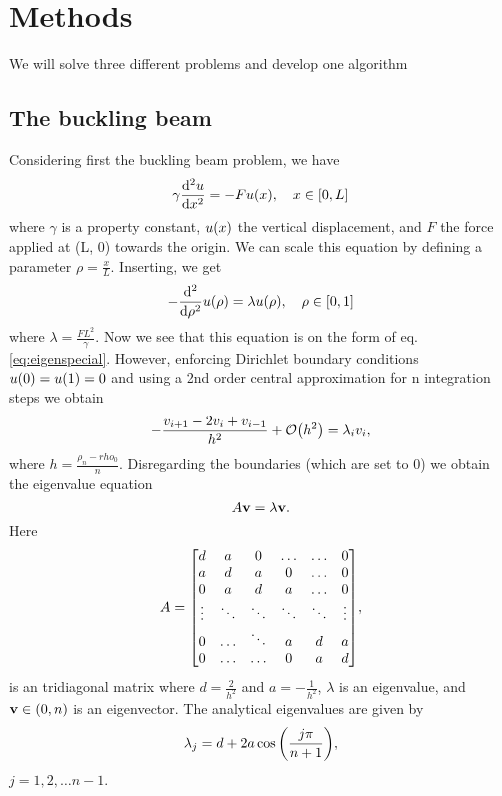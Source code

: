 \section{Methods}
\label{sec:methods}

We will solve three different problems and develop one algorithm

\subsection{The buckling beam}
\label{sec:bucklingbeam}

Considering first the buckling beam problem, we have
  \begin{equation}
    \gamma \dv[2]{u}{x} = -F u\qty(x), \quad x \in [0, L]
  \end{equation}
where $\gamma$ is a property constant, $u\qty(x)$ the vertical displacement, and
$F$ the force applied at (L, 0) towards the origin. We can scale this equation by defining
a parameter $\rho = \frac{x}{L}$. Inserting, we get
  \begin{equation}
    -\dv[2]{}{\rho}u\qty(\rho) = \lambda u\qty(\rho), \quad \rho \in [0, 1]
  \end{equation}
where $\lambda = \frac{FL^2}{\gamma}$. Now we see that this equation is on the form
of eq. \ref{eq:eigenspecial}. However, enforcing Dirichlet boundary conditions
$u\qty(0) = u\qty(1) = 0$ and using a 2nd order central approximation for n integration steps we obtain
  \begin{equation}
  \label{eq:disc1}
    -\frac{v_{i+1} - 2v_i + v_{i-1}}{h^2} + \order{h^2} = \lambda_i v_i,
  \end{equation}
where $h = \frac{\rho_n - rho_0}{n}$. Disregarding the boundaries (which are set to 0) we obtain the eigenvalue equation
  \begin{equation}
  \label{eq:buckbeam}
    A\vb{v} = \lambda \vb{v}.
  \end{equation}
Here
  \begin{equation}
    A =
      \mqty[d & a & 0 & \hdots & \hdots & 0 \\
            a & d & a & 0 & \hdots & 0 \\
            0 & a & d & a & \hdots & 0 \\
            \vdots & \ddots & \ddots & \ddots & \ddots & \vdots \\
            0 & \hdots & \ddots & a & d & a \\
            0 & \hdots & \hdots & 0 & a & d],
  \end{equation}
 is an tridiagonal matrix where $d = \frac{2}{h^2}$ and $a = -\frac{1}{h^2}$,
 $\lambda$ is an eigenvalue, and $\vb{v} \in \qty(0, n)$ is an eigenvector.
 The analytical eigenvalues are given by
  \begin{equation}
    \lambda_j = d + 2a\cos\qty(\frac{j\pi}{n + 1}),
  \end{equation}
$j = 1, 2, \dots n-1$.



